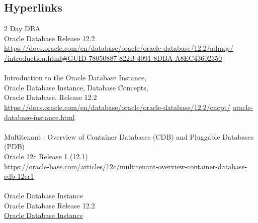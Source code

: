
\subsection{Hyperlinks}

2 Day DBA\\
Oracle Database Release 12.2\\
\href{https://docs.oracle.com/en/database/oracle/oracle-database/12.2/admqs/introduction.html#GUID-78050887-822B-4091-8DBA-A8EC43602350}{https://docs.oracle.com/en/database/oracle/oracle-database/12.2/admqs/}\\
\href{https://docs.oracle.com/en/database/oracle/oracle-database/12.2/admqs/introduction.html#GUID-78050887-822B-4091-8DBA-A8EC43602350}{/introduction.html\#GUID-78050887-822B-4091-8DBA-A8EC43602350}\\
\\
Introduction to the Oracle Database Instance,\\ 
Oracle Database Instance, Database Concepts,\\
Oracle Database, Release 12.2\\
\href{https://docs.oracle.com/en/database/oracle/oracle-database/12.2/cncpt/oracle-database-instance.html}{https://docs.oracle.com/en/database/oracle/oracle-database/12.2/cncpt/}\newline
\href{http://www.google.com}{oracle-database-instance.html}\\
\\
Multitenant : Overview of Container Databases (CDB) and Pluggable Databases (PDB)\\
Oracle 12c Release 1 (12.1)\\
\href{https://oracle-base.com/articles/12c/multitenant-overview-container-database-cdb-12cr1}{https://oracle-base.com/articles/12c/multitenant-overview-container-database-cdb-12cr1}\\
\\
Oracle Database Instance\\
Oracle Database Release 12.2\\
\href{https://docs.oracle.com/en/database/oracle/oracle-database/12.2/cncpt/oracle-database-instance.html#GUID-67247052-CE3F-44D2-BA3E-7067DEF4B6D5}{Oracle Database Instance}\\
\\
